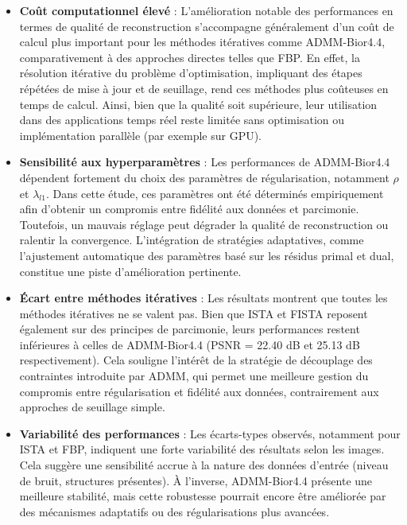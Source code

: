\begin{itemize}[label=-]

    \item \textbf{Coût computationnel élevé} : 
    L'amélioration notable des performances en termes de qualité de reconstruction s'accompagne généralement d'un coût de calcul plus important pour les méthodes itératives comme ADMM-Bior4.4, comparativement à des approches directes telles que FBP. En effet, la résolution itérative du problème d'optimisation, impliquant des étapes répétées de mise à jour et de seuillage, rend ces méthodes plus coûteuses en temps de calcul. Ainsi, bien que la qualité soit supérieure, leur utilisation dans des applications temps réel reste limitée sans optimisation ou implémentation parallèle (par exemple sur GPU).

    \item \textbf{Sensibilité aux hyperparamètres} :
    Les performances de ADMM-Bior4.4 dépendent fortement du choix des paramètres de régularisation, notamment $\rho$ et $\lambda_{l1}$. Dans cette étude, ces paramètres ont été déterminés empiriquement afin d'obtenir un compromis entre fidélité aux données et parcimonie. Toutefois, un mauvais réglage peut dégrader la qualité de reconstruction ou ralentir la convergence. L'intégration de stratégies adaptatives, comme l'ajustement automatique des paramètres basé sur les résidus primal et dual, constitue une piste d'amélioration pertinente.

    \item \textbf{Écart entre méthodes itératives} :
    Les résultats montrent que toutes les méthodes itératives ne se valent pas. Bien que ISTA et FISTA reposent également sur des principes de parcimonie, leurs performances restent inférieures à celles de ADMM-Bior4.4 (PSNR = 22.40 dB et 25.13 dB respectivement). Cela souligne l'intérêt de la stratégie de découplage des contraintes introduite par ADMM, qui permet une meilleure gestion du compromis entre régularisation et fidélité aux données, contrairement aux approches de seuillage simple.

    \item \textbf{Variabilité des performances} :
    Les écarts-types observés, notamment pour ISTA et FBP, indiquent une forte variabilité des résultats selon les images. Cela suggère une sensibilité accrue à la nature des données d'entrée (niveau de bruit, structures présentes). À l'inverse, ADMM-Bior4.4 présente une meilleure stabilité, mais cette robustesse pourrait encore être améliorée par des mécanismes adaptatifs ou des régularisations plus avancées.

\end{itemize}
